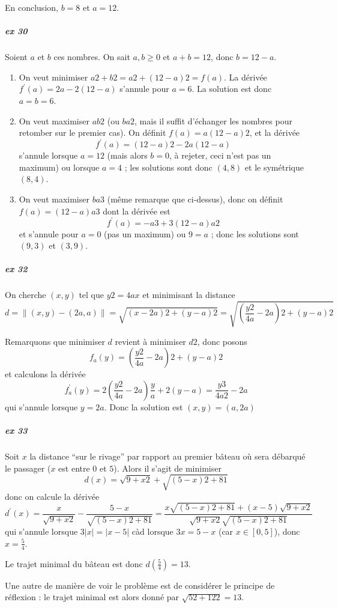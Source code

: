 En conclusion, $b = 8$ et $a = 12$.

\subparagraph{ex 30} Soient $a$ et $b$ ces nombres. On sait $a, b \geq
0$ et $a+b = 12$, donc $b = 12 - a$.
\begin{enumerate}
\item On veut minimiser $a2+ b2 = a2 + (12-a)2 = f(a)$. La dérivée
  $f^\prime(a) = 2a - 2 (12 - a)$ s'annule pour $a = 6$. La solution
  est donc $a = b = 6$.

\item On veut maximiser $a b2$ (ou $ba2$, mais il suffit d'échanger
  les nombres pour retomber sur le premier cas). On définit $f(a) = a
  (12-a)2$, et la dérivée
  \begin{equation*}
    f^\prime(a) = (12-a)2 - 2 a (12-a)
  \end{equation*}
  s'annule lorsque $a = 12$ (mais alors $b = 0$, à rejeter, ceci n'est
  pas un maximum) ou lorsque $a = 4$ ; les solutions sont donc $(4,8)$
  et le symétrique $(8,4)$.

\item On veut maximiser $ba3$ (même remarque que ci-dessus), donc on
  définit
  \begin{math}
    f(a) = (12-a) a3
  \end{math}
  dont la dérivée est
  \begin{equation*}
    f^\prime(a) = -a3 + 3 (12-a)a2
  \end{equation*}
  et s'annule pour $a = 0$ (pas un maximum) ou $9 = a$ ; donc les
  solutions sont $(9,3)$ et $(3,9)$.
\end{enumerate}

\subparagraph{ex 32}
On cherche $(x,y)$ tel que $y2 = 4ax$ et minimisant la distance
\begin{equation*}
d = \| (x,y)-(2a,a) \| = \sqrt{(x-2a)2 + (y-a)2} =
\sqrt{\left(\frac{y2}{4a}-2a\right)2 + (y-a)2}
\end{equation*}

Remarquons que minimiser $d$ revient à minimiser $d2$, donc posons
\begin{equation*}
f_a(y) = \left(\frac{y2}{4a}-2a\right)2 + (y-a)2
\end{equation*}
et calculons la dérivée
\begin{equation*}
  f_a^\prime(y)  = 2 \left(\frac{y2}{4a}-2a\right) \frac y a + 2
  (y-a) = \frac{y3}{4a2}-2a
\end{equation*}
qui s'annule lorsque $y = 2a$. Donc la solution est $(x,y) = (a,2a)$

\subparagraph{ex 33}
Soit $x$ la distance ``sur le rivage'' par rapport au premier bâteau
où sera débarqué le passager ($x$ est entre $0$ et $5$). Alors il
s'agit de minimiser
\begin{equation*}
  d(x) = \sqrt{9+x2} + \sqrt{(5-x)2 + 81}
\end{equation*}
donc on calcule la dérivée
\begin{equation*}
  d^\prime(x) = \frac{x}{\sqrt{9+x2}} - \frac{5-x}{\sqrt{(5-x)2 + 81}}
 = \frac{x\sqrt{(5-x)2 + 81} + (x-5)\sqrt{9+x2}}{\sqrt{9+x2}\sqrt{(5-x)2 + 81}}
\end{equation*}
qui s'annule lorsque $3 |x| = |x-5|$ càd lorsque $3x = 5 - x$
(car $x \in [0,5]$), donc $x = \frac{5}{4}$.

Le trajet minimal du bâteau est donc $d(\frac{5}{4}) = 13$.

Une autre de manière de voir le problème est de considérer le principe
de réflexion : le trajet minimal est alors donné par $\sqrt{52 +
  122} = 13$.

